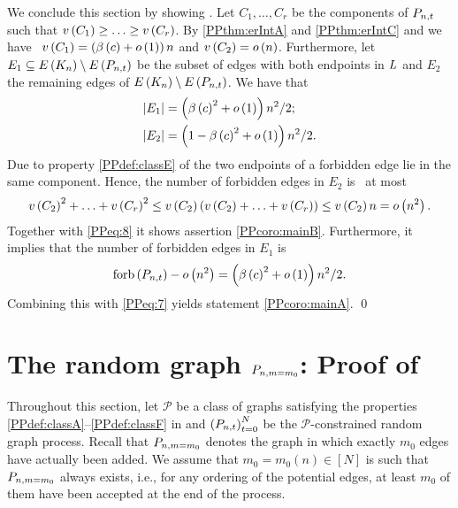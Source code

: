 We conclude this section by showing .
Let $C_1, \ldots, C_r$ be the components of $P_{n,t}$ such that $v\left({C_1}\right)\geq \ldots \geq v\left({C_r}\right)$. By \ref{PPthm:erIntA} and \ref{PPthm:erIntC} and  we have \whp\ $v\left({C_1}\right)=\left(\beta\left(c\right)+o\left(1\right)\right)n$ and $v\left({C_2}\right)=o\left(n\right)$. Furthermore, let $E_1\subseteq E\left(K_n\right)\setminus E\left(P_{n,t}\right)$ be the subset of edges with both endpoints in $L$ and $E_2$ the remaining edges of $E\left(K_n\right)\setminus E\left(P_{n,t}\right)$. We have that \whp\
\begin{align}
\left|E_1\right|&=\left(\beta\left(c\right)^2+o\left(1\right)\right)n^2/2 \label{PPeq:7};\\
\left|E_2\right|&=\left(1-\beta\left(c\right)^2+o\left(1\right)\right)n^2/2. \label{PPeq:8}
\end{align}
Due to property \ref{PPdef:classE} of  the two endpoints of a forbidden edge lie in the same component. Hence, the number of forbidden edges in $E_2$ is \whp\ at most
\begin{align*}
v\left({C_2}\right)^2+\ldots+v\left({C_r}\right)^2\leq v\left({C_2}\right)\left(v\left({C_2}\right)+\ldots+v\left({C_r}\right)\right)\leq v\left({C_2}\right)n=o\left(n^2\right).
\end{align*}
Together with \eqref{PPeq:8} it shows assertion \ref{PPcoro:mainB}. Furthermore, it implies that the number of forbidden edges in $E_1$ is \whp\
\begin{align*}
\operatorname{forb}\left(P_{n,t}\right)-o\left(n^2\right)=\left(\beta\left(c\right)^2+o\left(1\right)\right)n^2/2.
\end{align*} 
Combining this with \eqref{PPeq:7} yields statement \ref{PPcoro:mainA}. \qed

\section[The random graph \texorpdfstring{$\acc{n}{m_0}$}{Pn,m=m0}]{The random graph \texorpdfstring{$\acc{n}{m_0}$}{Pn,m=m0}: Proof of }\label{PPsec:accepted_graph}
Throughout this section, let $\mathcal{P}$ be a class of graphs satisfying the properties \ref{PPdef:classA}--\ref{PPdef:classF} in  and $\left(P_{n,t}\right)_{t=0}^{N}$ be the $\mathcal{P}$-constrained random graph process. Recall that $\acc{n}{m_0}$ denotes the graph in which exactly $m_0$ edges have actually been added. We assume that $m_0=m_0(n)\in\left[N\right]$ is such that $\acc{n}{m_0}$ always exists, i.e., for any ordering of the potential edges, at least $m_0$ of them have been accepted at the end of the process.


